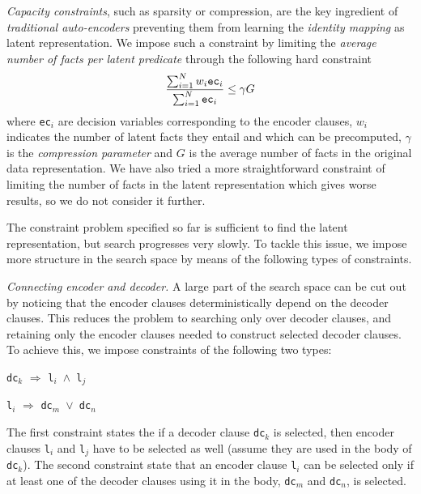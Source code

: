 \textit{Capacity constraints}, such as sparsity or compression, are the key ingredient of \textit{traditional auto-encoders} preventing them from learning the \textit{identity mapping} as latent representation.
We impose such a constraint by limiting the \textit{average number of facts per latent predicate} through the following hard constraint
$$ \frac{\sum_{i=1}^{N}w_i\text{\texttt{ec}}_i}{\sum_{i=1}^N\text{\texttt{ec}}_i} \leq \gamma G$$
where \texttt{ec}$_i$ are decision variables corresponding to the encoder clauses, $w_i$ indicates the number of latent facts they entail and which can be precomputed, $\gamma$ is the \textit{compression parameter} and $G$ is the average number of facts in the original data representation.
We have also tried a more straightforward constraint of limiting the number of facts in the latent representation which gives worse results, so we do not consider it further.


The constraint problem specified so far is sufficient to find the latent representation, but search progresses very slowly.
To tackle this issue, we impose more structure in the search space by means of the following types of constraints.

\textit{Connecting encoder and decoder.}
A large part of the search space can be cut out by noticing that the encoder clauses deterministically depend on the decoder clauses.
This reduces the problem to searching only over decoder clauses, and retaining only the encoder clauses needed to construct selected decoder clauses.
To achieve this, we impose constraints of the following two types:
\begin{center}
	\texttt{dc}$_k$ $\Rightarrow$ \texttt{l$_i$ $\wedge$  l$_j$}

    \texttt{l}$_i$ $\Rightarrow$ \texttt{dc$_m$ $\vee$ dc$_n$}
\end{center}
The first constraint states the if a decoder clause \texttt{dc}$_k$ is selected, then encoder clauses \texttt{l$_i$} and \texttt{l$_j$} have to be selected as well (assume they are used in the body of \texttt{dc}$_k$).
The second constraint state that an encoder clause \texttt{l}$_i$ can be selected only if at least one of the decoder clauses using it in the body, \texttt{dc$_m$} and \texttt{dc$_n$}, is selected.


